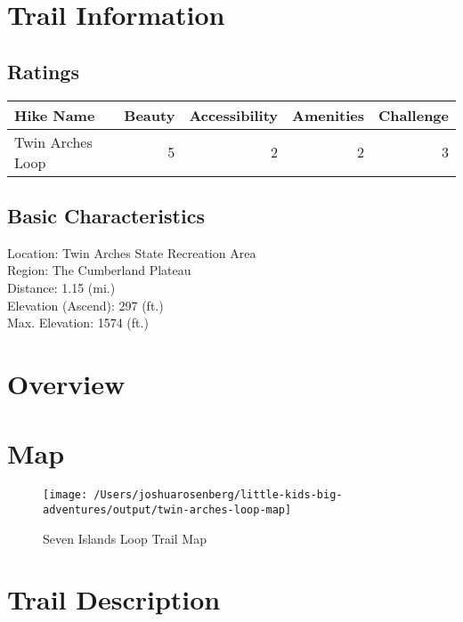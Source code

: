 \documentclass[
]{book}
\begin{document}
\hypertarget{trail-information-9}{%
\section{Trail Information}\label{trail-information-9}}

\hypertarget{ratings-4}{%
\subsection{Ratings}\label{ratings-4}}

\begin{tabular}{l|r|r|r|r}
\hline
Hike Name & Beauty & Accessibility & Amenities & Challenge\\
\hline
Twin Arches Loop & 5 & 2 & 2 & 3\\
\hline
\end{tabular}

\hypertarget{basic-characteristics-9}{%
\subsection{Basic Characteristics}\label{basic-characteristics-9}}

Location: Twin Arches State Recreation Area\\
Region: The Cumberland Plateau\\
Distance: 1.15 (mi.)\\
Elevation (Ascend): 297 (ft.)\\
Max. Elevation: 1574 (ft.)

\hypertarget{overview-9}{%
\section{Overview}\label{overview-9}}

\hypertarget{map-9}{%
\section{Map}\label{map-9}}

\begin{figure}
\texttt{[image: /Users/joshuarosenberg/little-kids-big-adventures/output/twin-arches-loop-map]} \caption{Seven Islands Loop Trail Map}\label{fig:unnamed-chunk-27}
\end{figure}

\hypertarget{trail-description-9}{%
\section{Trail Description}\label{trail-description-9}}
\end{document}
